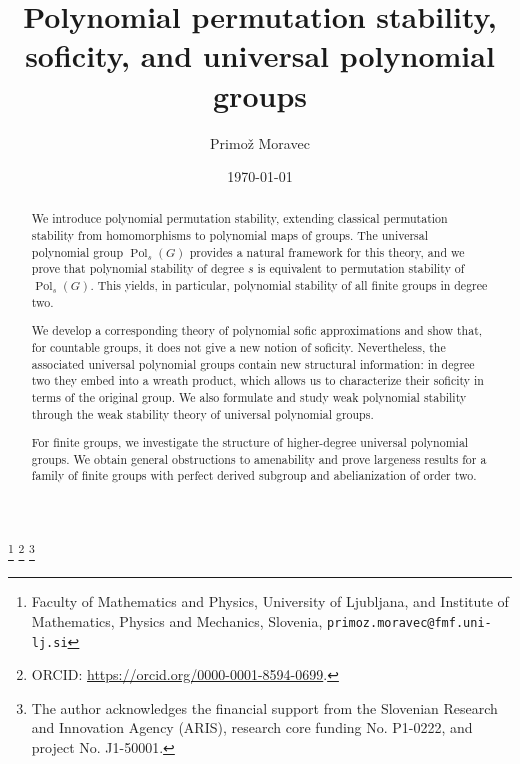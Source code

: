 \documentclass[a4paper,12pt]{amsart}
\theoremstyle{plain}
\theoremstyle{definition}
\theoremstyle{remark}
\numberwithin{equation}{subsection}
\DeclareMathOperator{\Pold}{Pol}
\begin{document}
\title[Polynomial stability and soficity]{Polynomial permutation stability, soficity, and universal polynomial groups}
\author{Primo\v z Moravec}
\thanks{Faculty of  Mathematics and Physics, University of Ljubljana,
and Institute of Mathematics, Physics and Mechanics,
Slovenia, 
\texttt{primoz.moravec@fmf.uni-lj.si}}
\thanks{ORCID: \url{https://orcid.org/0000-0001-8594-0699}.}
\thanks{The author acknowledges the financial support from the Slovenian Research and Innovation Agency (ARIS), research core funding No. P1-0222, and project No. J1-50001.}
\date{\today}
\begin{abstract}
\noindent
We introduce polynomial permutation stability, extending classical
permutation stability from homomorphisms to polynomial maps of groups.
The universal polynomial group $\Pold_s(G)$ provides a natural
framework for this theory, and we prove that polynomial stability of
degree $s$ is equivalent to permutation stability of $\Pold_s(G)$.
This yields, in particular, polynomial stability of all finite groups
in degree two.

We develop a corresponding theory of polynomial sofic
approximations and show that, for countable groups, it does not give a
new notion of soficity. Nevertheless, the associated universal
polynomial groups contain new structural information: in degree two
they embed into a wreath product, which allows us to characterize their
soficity in terms of the original group. We also formulate and study
weak polynomial stability through the weak stability theory of
universal polynomial groups.

For finite groups, we investigate the structure of higher-degree
universal polynomial groups. We obtain general obstructions to
amenability and prove largeness results for a family of finite groups
with perfect derived subgroup and abelianization of order two.
\end{abstract}
\end{document}
